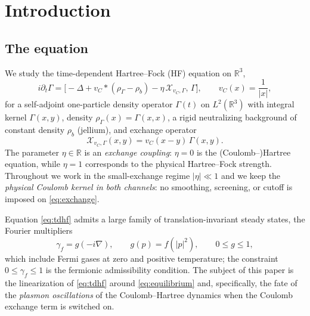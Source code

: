\documentclass[11pt,a4paper]{amsart}
\theoremstyle{definition}
\theoremstyle{remark}
\newcommand{\R}{\mathbb{R}}
\newcommand{\sX}{\mathcal{X}}
\begin{document}
\setcounter{tocdepth}{1}
\tableofcontents

\section{Introduction}\label{sec:intro}

\subsection{The equation}
We study the time-dependent Hartree--Fock (HF) equation on $\R^3$,
\begin{equation}\label{eq:tdhf}
i\partial_t\Gamma=\bigl[-\Delta+v_C*(\rho_\Gamma-\rho_b)-\eta\,\sX_{v_C,\Gamma},\,\Gamma\bigr],
\qquad v_C(x)=\frac{1}{|x|},
\end{equation}
for a self-adjoint one-particle density operator $\Gamma(t)$ on $L^2(\R^3)$ with integral kernel $\Gamma(x,y)$, density $\rho_\Gamma(x)=\Gamma(x,x)$, a rigid neutralizing background of constant density $\rho_b$ (jellium), and exchange operator
\begin{equation}\label{eq:exchange}
\sX_{v_C,\Gamma}(x,y)=v_C(x-y)\,\Gamma(x,y).
\end{equation}
The parameter $\eta\in\R$ is an \emph{exchange coupling}: $\eta=0$ is the (Coulomb--)Hartree equation, while $\eta=1$ corresponds to the physical Hartree--Fock strength. Throughout we work in the small-exchange regime $|\eta|\ll1$ and we keep the \emph{physical Coulomb kernel in both channels}: no smoothing, screening, or cutoff is imposed on \eqref{eq:exchange}.

Equation \eqref{eq:tdhf} admits a large family of translation-invariant steady states, the Fourier multipliers
\begin{equation}\label{eq:equilibrium}
\gamma_f=g(-i\nabla),\qquad g(p)=f(|p|^2),\qquad 0\le g\le1,
\end{equation}
which include Fermi gases at zero and positive temperature; the constraint $0\le\gamma_f\le1$ is the fermionic admissibility condition. The subject of this paper is the linearization of \eqref{eq:tdhf} around \eqref{eq:equilibrium} and, specifically, the fate of the \emph{plasmon oscillations} of the Coulomb--Hartree dynamics when the Coulomb exchange term is switched on.
\end{document}
